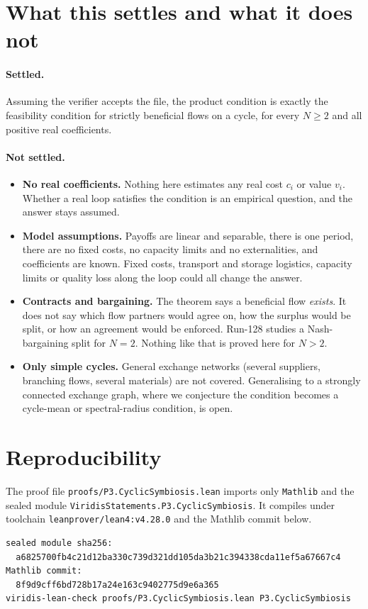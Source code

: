 \documentclass[11pt]{article}
\theoremstyle{definition}
\theoremstyle{remark}
\begin{document}
\section{What this settles and what it does not}
\label{sec:limits}
\paragraph{Settled.} Assuming the verifier accepts the file, the product condition is exactly the
feasibility condition for strictly beneficial flows on a cycle, for every $N\ge2$ and all positive
real coefficients.

\paragraph{Not settled.}
\begin{itemize}
\item \textbf{No real coefficients.} Nothing here estimates any real cost $c_i$ or value $v_i$.
Whether a real loop satisfies the condition is an empirical question, and the answer stays
assumed.
\item \textbf{Model assumptions.} Payoffs are linear and separable, there is one period, there are
no fixed costs, no capacity limits and no externalities, and coefficients are known. Fixed
costs, transport and storage logistics, capacity limits or quality loss along the loop could all
change the answer.
\item \textbf{Contracts and bargaining.} The theorem says a beneficial flow \emph{exists}. It does
not say which flow partners would agree on, how the surplus would be split, or how an agreement
would be enforced. Run-128 studies a Nash-bargaining split for $N=2$. Nothing like that is
proved here for $N>2$.
\item \textbf{Only simple cycles.} General exchange networks (several suppliers, branching flows,
several materials) are not covered. Generalising to a strongly connected exchange graph, where
we conjecture the condition becomes a cycle-mean or spectral-radius condition, is open.
\end{itemize}

\section{Reproducibility}
\sloppy
The proof file \texttt{proofs/P3.CyclicSymbiosis.lean} imports only \texttt{Mathlib} and the
sealed module \texttt{ViridisStatements.P3.CyclicSymbiosis}. It compiles under toolchain
\texttt{leanprover/lean4:v4.28.0} and the Mathlib commit below.
\begin{lstlisting}[language={},frame=none]
sealed module sha256:
  a6825700fb4c21d12ba330c739d321dd105da3b21c394338cda11ef5a67667c4
Mathlib commit:
  8f9d9cff6bd728b17a24e163c9402775d9e6a365
viridis-lean-check proofs/P3.CyclicSymbiosis.lean P3.CyclicSymbiosis
\end{lstlisting}
\end{document}
